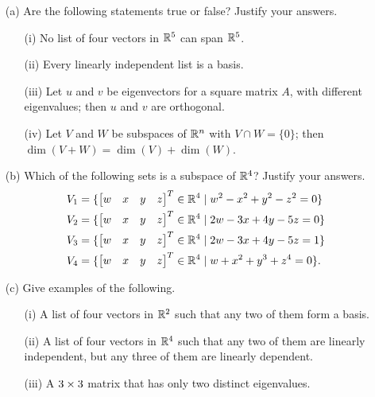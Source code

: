 \documentclass[a4paper]{article}
\begin{document}
\begin{problem}[Mock 1]
 \begin{itemize}
  \item[(a)]
   Are the following statements true or false?  Justify your answers.
   \begin{itemize}
    \item[(i)] No list of four vectors in ${\mathbb{R}}^5$ can span ${\mathbb{R}}^5$.
    \item[(ii)] Every linearly independent list is a basis.
    \item[(iii)] Let $u$ and $v$ be eigenvectors for a square matrix
     $A$, with different eigenvalues; then $u$ and $v$ are orthogonal.
    \item[(iv)] Let $V$ and $W$ be subspaces of ${\mathbb{R}}^n$ with
     $V\cap W=\{0\}$; then $\dim(V+W)=\dim(V)+\dim(W)$.
   \end{itemize}
  \item[(b)]
   Which of the following sets is a subspace of ${\mathbb{R}}^4$?  Justify your
   answers. 
   \begin{align*}
    V_1 &= \{\left[\begin{matrix} w&x&y&z\end{matrix}\right]^T \in{\mathbb{R}}^4 \;|\; w^2-x^2+y^2-z^2=0\} \\
    V_2 &= \{\left[\begin{matrix} w&x&y&z\end{matrix}\right]^T \in{\mathbb{R}}^4 \;|\; 2w-3x+4y-5z=0\} \\
    V_3 &= \{\left[\begin{matrix} w&x&y&z\end{matrix}\right]^T \in{\mathbb{R}}^4 \;|\; 2w-3x+4y-5z=1\} \\
    V_4 &= \{\left[\begin{matrix} w&x&y&z\end{matrix}\right]^T \in{\mathbb{R}}^4 \;|\; w+x^2+y^3+z^4=0\}.
   \end{align*}
  \item[(c)] Give examples of the following. 
   \begin{itemize}
    \item[(i)] A list of four vectors in ${\mathbb{R}}^2$ such that any two of
     them form a basis.
    \item[(ii)] A list of four vectors in ${\mathbb{R}}^4$ such that any two of
     them are linearly independent, but any three of them are linearly
     dependent. 
    \item[(iii)] A $3\times 3$ matrix that has only two distinct
     eigenvalues. 
   \end{itemize}
 \end{itemize}
\end{problem}
\end{document}
